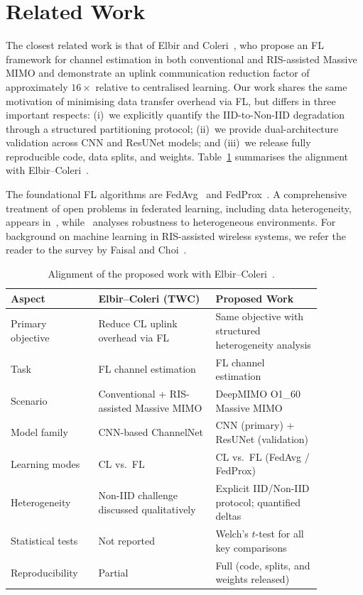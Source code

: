\documentclass[runningheads]{llncs}
\begin{document}
\section{Related Work}
\label{sec:related}

The closest related work is that of Elbir and Coleri~\cite{elbir2021flchannel},
who propose an FL framework for channel estimation in both conventional
and RIS-assisted Massive MIMO and demonstrate an uplink communication
reduction factor of approximately $16\times$ relative to centralised
learning.  Our work shares the same motivation of minimising data
transfer overhead via FL, but differs in three important respects:
(i)~we explicitly quantify the IID-to-Non-IID degradation through a
structured partitioning protocol; (ii)~we provide dual-architecture
validation across CNN and ResUNet models; and (iii)~we release fully
reproducible code, data splits, and weights.
Table~\ref{tab:alignment_ec} summarises the alignment with
Elbir--Coleri~\cite{elbir2021flchannel}.

The foundational FL algorithms are FedAvg~\cite{mcmahan2017fedavg} and
FedProx~\cite{li2020fedprox}.  A comprehensive treatment of open
problems in federated learning, including data heterogeneity, appears
in~\cite{kairouz2021survey}, while~\cite{ghosh2019robust} analyses
robustness to heterogeneous environments.  For background on machine
learning in RIS-assisted wireless systems, we refer the reader to the
survey by Faisal and Choi~\cite{faisal2022rismlsurvey}.

\begin{table}[htbp]
\caption{Alignment of the proposed work with Elbir--Coleri~\cite{elbir2021flchannel}.}
\label{tab:alignment_ec}
\centering
\begin{tabular}{p{0.24\linewidth}p{0.33\linewidth}p{0.30\linewidth}}
\toprule
Aspect & Elbir--Coleri (TWC) & Proposed Work \\
\midrule
Primary objective  & Reduce CL uplink overhead via FL
                   & Same objective with structured heterogeneity analysis \\
Task               & FL channel estimation
                   & FL channel estimation \\
Scenario           & Conventional + RIS-assisted Massive MIMO
                   & DeepMIMO O1\_60 Massive MIMO \\
Model family       & CNN-based ChannelNet
                   & CNN (primary) + ResUNet (validation) \\
Learning modes     & CL vs.\ FL
                   & CL vs.\ FL (FedAvg / FedProx) \\
Heterogeneity      & Non-IID challenge discussed qualitatively
                   & Explicit IID/Non-IID protocol; quantified deltas \\
Statistical tests  & Not reported
                   & Welch's $t$-test for all key comparisons \\
Reproducibility    & Partial
                   & Full (code, splits, and weights released) \\
\bottomrule
\end{tabular}
\end{table}
\end{document}
